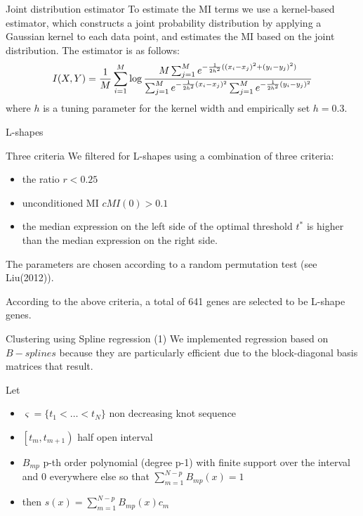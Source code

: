 \documentclass[handout]{beamer}
\begin{document}
\begin{frame}{Joint distribution estimator}
To estimate the MI terms we use a kernel-based estimator, which constructs a joint
probability distribution by applying a Gaussian kernel to each data point, and estimates
the MI based on the joint distribution. The estimator is as follows:
\[
I(X,Y) = \frac 1M \sum_{i=1}^M \log\frac{M\sum_{j=1}^M e^{-\frac{1}{2h^2}((x_i-x_j)^2+(y_i-y_j)^2)}}{%
                                      \sum_{j=1}^M e^{-\frac{1}{2h^2}(x_i-x_j)^2} \sum_{j=1}^M e^{-\frac{1}{2h^2}(y_i-y_j)^2}}
\]
where $h$ is a tuning parameter for the kernel width and empirically set $h=0.3$.
\end{frame}

\begin{frame}{L-shapes}
\begin{block}{Three criteria}
We filtered for L-shapes using a combination of three criteria:
\begin{itemize}
\item the ratio $r<0.25$
\item unconditioned MI $\mathit{cMI}(0)>0.1$
\item the median expression on the left side of the optimal threshold $t^{\ast}$ is higher
than the median expression on the right side.
\end{itemize}
\end{block}
The parameters are chosen according to a random permutation test (see Liu(2012)).

According to the above criteria, a total of 641 genes are selected to be L-shape genes.
\end{frame}

\begin{frame}{Clustering using Spline regression (1)}
We implemented regression based on  $B-splines$ because they are particularly efficient due to the block-diagonal basis matrices that result.

Let 
\begin {itemize}
\item $\varsigma=\lbrace t_1 < \ldots < t_N \rbrace$ non decreasing  knot sequence 
\item $\left[ t_m,t_{m+1} \right)$ half open interval
\item $B_{mp}$ p-th order polynomial (degree p-1) with finite support over the interval and 0 everywhere else so that  $\sum_{m=1}^{N-p}B_{mp}(x)=1$
\item then  $s(x)=\sum_{m=1}^{N-p}B_{mp}(x)c_m$ 
\end{itemize}

\end{frame}
\end{document}
